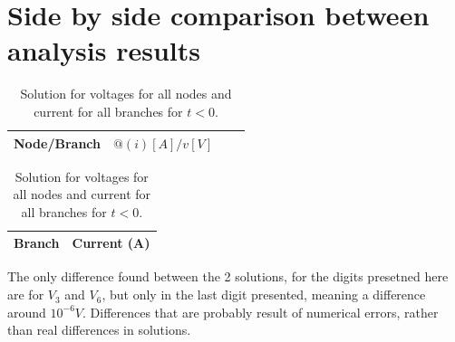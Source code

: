 \section{Side by side comparison between analysis results}
\label{sec:sidebyside}

\begin{table}[H]
    \begin{minipage}{.4\textwidth}
    \begin{table}[H]
    \centering
    \small
    \begin{tabular}{|c|c|c|c|}
          \hline
          Node/Branch & $@(i) [A]/ v [V]$\\
          \hline
          
          \hline
    \end{tabular}
    \caption{Solution from simulation.}
    \label{tab:ngs_tau}
    \end{table}
    \end{minipage}
    \begin{minipage}{.29\textwidth}
      \centering
      \begin{tabular}{c|c}
        \hline
          Branch &  Current (A) \\
          \hline
          
          \hline
      \end{tabular}
    \label{tab:current2}
    \caption{Currents from theoretical solution}
    \end{minipage}
    \begin{minipage}{.29\textwidth}
      
      \caption{Voltages from theoretical solution}
      \end{minipage}
    \caption{Solution for voltages for all nodes and current for all branches for $t<0$.}
    \end{table}

The only difference found between the 2 solutions, for the digits presetned here are for $V_3$ and $V_6$, but only in the last digit presented, meaning a difference around $10^{-6} V$. Differences that are probably result of numerical errors, rather than real differences in solutions.

